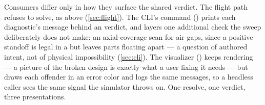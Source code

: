 Consumers differ only in how they surface the shared verdict. The flight path refuses to solve, as
above (\cref{sec:flight}). The CLI's  command () prints
each diagnostic's message behind an  verdict, and layers one additional check the sweep
deliberately does not make: an axial-coverage scan for air gaps, since a positive standoff is legal
in a  but leaves parts floating apart --- a question of authored intent, not of
physical impossibility (\cref{sec:cli}). The visualizer ()
keeps rendering --- a picture of the broken design is exactly what a user fixing it needs --- but
draws each offender in an error color and logs the same messages, so a headless caller sees the
same signal the simulator throws on. One resolve, one verdict, three presentations.
